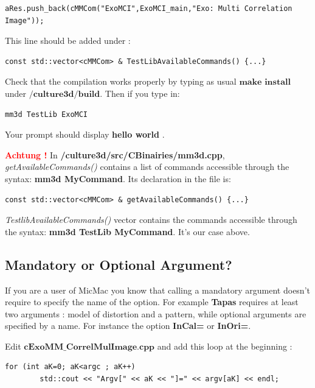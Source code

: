\begin{verbatim}
aRes.push_back(cMMCom("ExoMCI",ExoMCI_main,"Exo: Multi Correlation Image"));
\end{verbatim}

This line should be added under : \newline
\begin{verbatim}
const std::vector<cMMCom> & TestLibAvailableCommands() {...}
\end{verbatim}

Check that the compilation works properly by typing as usual $\textbf{make install}$ under \og$\textbf{/culture3d/build}$\fg. Then if you type in:

\begin{verbatim}
mm3d TestLib ExoMCI
\end{verbatim}
Your prompt should display \og \textbf{hello world} \fg.\newline

 \textbf{\textcolor{red}{Achtung !}} In \textbf{/culture3d/src/CBinairies/mm3d.cpp},  \textit{getAvailableCommands()} contains a list of commands accessible through the syntax: \textbf{mm3d MyCommand}. Its declaration in the file is:
\begin{verbatim}
const std::vector<cMMCom> & getAvailableCommands() {...}
\end{verbatim}

\textit{TestlibAvailableCommands()} vector contains the commands accessible through the syntax: \textbf{mm3d TestLib MyCommand}. It's our case above.

\subsection{Mandatory or Optional Argument?}
If you are a user of MicMac you know that calling a mandatory argument doesn't require to specify the name of the option. For example \textbf{Tapas} requires at least two arguments : model of distortion and a pattern, while optional arguments are specified by a name. For instance the option \textbf{InCal=} or \textbf{InOri=}.\newline


Edit $\textbf{cExoMM\_CorrelMulImage.cpp}$ and add this loop at the beginning :\newline

\begin{verbatim}
for (int aK=0; aK<argc ; aK++)
        std::cout << "Argv[" << aK << "]=" << argv[aK] << endl;
\end{verbatim}


